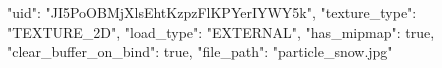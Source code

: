 {
    "uid": "JI5PoOBMjXlsEhtKzpzFlKPYerIYWY5k",
    "texture_type": "TEXTURE_2D",
    "load_type": "EXTERNAL",
    "has_mipmap": true,
    "clear_buffer_on_bind": true,
    "file_path": "particle_snow.jpg"
}
